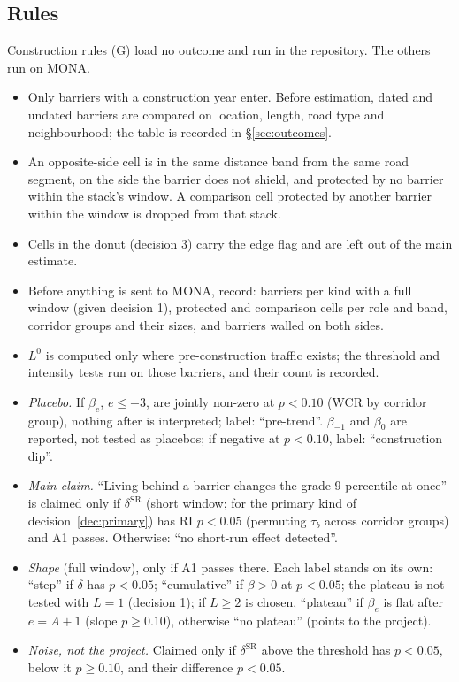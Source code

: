 \documentclass[11pt]{article}
\newcommand{\prule}[1]{\item[\(\Diamond\) #1]}
\begin{document}
\subsection{Rules}\label{sec:rules}

Construction rules (G) load no outcome and run in the repository. The others run on MONA.
\begin{itemize}[leftmargin=4.2em]
\prule{G1} Only barriers with a construction year enter. Before estimation, dated and undated
  barriers are compared on location, length, road type and neighbourhood; the table is
  recorded in \S\ref{sec:outcomes}.
\prule{G2} An opposite-side cell is in the same distance band from the same road segment, on the
  side the barrier does not shield, and protected by no barrier within the stack's window. A
  comparison cell protected by another barrier within the window is dropped from that stack.
\prule{G3} Cells in the donut (decision 3) carry the edge flag and are left out of the main
  estimate.
\prule{G4} Before anything is sent to MONA, record: barriers per kind with a full window (given
  decision 1), protected and comparison cells per role and band, corridor groups and their
  sizes, and barriers walled on both sides.
\prule{G5} \(L^0\) is computed only where pre-construction traffic exists; the threshold and
  intensity tests run on those barriers, and their count is recorded.
\prule{A1} \emph{Placebo.} If \(\beta_e\), \(e \le -3\), are jointly non-zero at \(p < 0.10\)
  (WCR by corridor group), nothing after is interpreted; label: ``pre-trend''. \(\beta_{-1}\) and
  \(\beta_0\) are reported, not tested as placebos; if negative at \(p < 0.10\), label:
  ``construction dip''.
\prule{A2} \emph{Main claim.} ``Living behind a barrier changes the grade-9 percentile at once''
  is claimed only if \(\delta^{\text{SR}}\) (short window; for the primary kind of
  decision~\ref{dec:primary}) has RI \(p < 0.05\) (permuting
  \(\tau_b\) across corridor groups) and A1 passes. Otherwise: ``no short-run effect detected''.
\prule{A3} \emph{Shape} (full window), only if A1 passes there. Each label stands on its own:
  ``step'' if \(\delta\) has \(p < 0.05\); ``cumulative'' if \(\beta > 0\) at \(p < 0.05\);
  the plateau is not tested with \(L = 1\) (decision 1); if \(L \ge 2\) is chosen, ``plateau''
  if \(\beta_e\) is flat after \(e = A + 1\) (slope \(p \ge 0.10\)), otherwise ``no plateau''
  (points to the project).
\prule{B1} \emph{Noise, not the project.} Claimed only if \(\delta^{\text{SR}}\) above the
  threshold has \(p < 0.05\), below it \(p \ge 0.10\), and their difference \(p < 0.05\).

\end{itemize}
\end{document}
